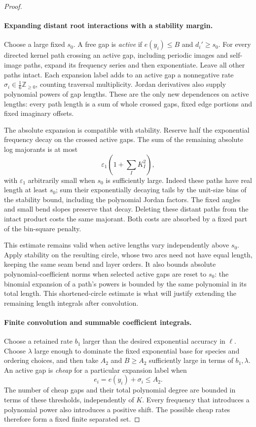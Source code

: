 \begin{proof}
\paragraph{Expanding distant root interactions with a stability margin.}
Choose a large fixed \(s_0\). A free gap is \emph{active} if
\(e(y_i)\le B\) and \(d_i'\ge s_0\). For every directed kernel path
crossing an active gap, including periodic images and self-image paths,
expand its frequency series and then exponentiate. Leave all other
paths intact. Each expansion label adds to an active gap a nonnegative
rate \(\sigma_i\in\tfrac16\mathbb Z_{\ge0}\), counting traversal
multiplicity. Jordan derivatives also supply polynomial powers of gap
lengths. These are the only new dependences on active lengths: every
path length is a sum of whole crossed gaps, fixed edge portions and
fixed imaginary offsets.

The absolute expansion is compatible with stability. Reserve half the
exponential frequency decay on the crossed active gaps. The sum of the
remaining absolute log majorants is at most
\[
 \varepsilon_1\left(1+\sum_I K_I^2\right),
\]
with \(\varepsilon_1\) arbitrarily small when \(s_0\) is sufficiently
large. Indeed these paths have real length at least \(s_0\); sum their
exponentially decaying tails by the unit-size bins of the stability
bound, including the polynomial Jordan factors. The fixed angles and
small bend slopes preserve that decay. Deleting these distant paths
from the intact product costs the same majorant. Both costs are
absorbed by a fixed part of the bin-square penalty.

This estimate remains valid when active lengths vary independently
above \(s_0\). Apply stability on the resulting circle, whose two arcs
need not have equal length, keeping the same seam bend and layer
orders. It also bounds absolute polynomial-coefficient norms when
selected active gaps are reset to \(s_0\): the binomial expansion of a
path's powers is bounded by the same polynomial in its total length.
This shortened-circle estimate is what will justify extending the
remaining length integrals after convolution.

\paragraph{Finite convolution and summable coefficient integrals.}
Choose a retained rate \(b_1\) larger than the desired exponential
accuracy in \(\ell\). Choose \(\lambda\) large enough to dominate the
fixed exponential base for species and ordering choices, and then take
\(A_2\) and \(B\ge A_2\) sufficiently large in terms of \(b_1,\lambda\).
An active gap is \emph{cheap} for a particular expansion label when
\[
 e_i=e(y_i)+\sigma_i\le A_2.
\]
The number of cheap gaps and their total polynomial degree are bounded
in terms of these thresholds, independently of \(K\). Every frequency
that introduces a polynomial power also introduces a positive shift.
The possible cheap rates therefore form a fixed finite separated set.


\end{proof}
